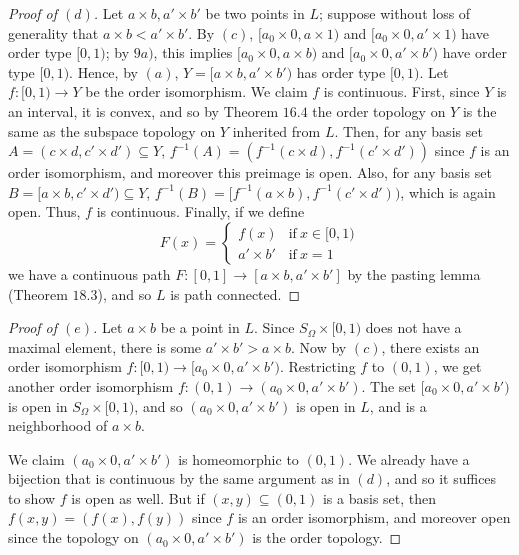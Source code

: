 \documentclass[12pt]{article}
\theoremstyle{remark}
\begin{document}
\begin{proof}[Proof of $(d)$]
  Let $a \times b, a' \times b'$ be two points in $L$; suppose without loss of
  generality that $a \times b < a' \times b'$. By $(c)$, $[a_0 \times 0,a \times
  1)$ and $[a_0 \times 0,a' \times 1)$ have order type $[0,1)$; by $9a)$, this
  implies $[a_0 \times 0,a \times b)$ and $[a_0 \times 0,a' \times b')$ have
  order type $[0,1)$. Hence, by $(a)$, $Y = [a \times b,a' \times b')$ has
  order type $[0,1)$. Let $f\colon [0,1) \to Y$ be the order isomorphism. We claim $f$ is continuous. First, since $Y$ is an interval, it is convex, and so by Theorem $16.4$ the order topology on $Y$ is the same as the subspace topology on $Y$ inherited from $L$. Then, for any basis set $A = (c \times d,c' \times d') \subseteq Y$, $f^{-1}(A) = (f^{-1}(c \times d),f^{-1}(c' \times d'))$ since $f$ is an order isomorphism, and moreover this preimage is open. Also, for any basis set $B = [a \times b,c'\times d') \subseteq Y$, $f^{-1}(B) = [f^{-1}(a \times b),f^{-1}(c' \times d'))$, which is again open. Thus, $f$ is continuous. Finally, if we define
  \begin{equation*}
    F(x) = \begin{cases}
      f(x) & \text{if}~x \in [0,1)\\
      a' \times b' & \text{if}~x=1
    \end{cases}
  \end{equation*}
  we have a continuous path $F\colon [0,1] \to [a \times b,a' \times b']$ by the pasting lemma (Theorem $18.3$), and so $L$ is path connected.
\end{proof}
\begin{proof}[Proof of $(e)$]
  Let $a \times b$ be a point in $L$. Since $S_\Omega \times [0,1)$ does not
  have a maximal element, there is some $a' \times b' > a \times b$. Now by
  $(c)$, there exists an order isomorphism $f\colon [0,1) \to [a_0 \times 0,a'
  \times b')$. Restricting $f$ to $(0,1)$, we get another order isomorphism
  $f\colon (0,1) \to (a_0 \times 0,a'\times b')$. The set $[a_0 \times 0,a' \times b')$ is open in $S_\Omega \times [0,1)$, and so $(a_0 \times 0,a' \times b')$ is open in $L$, and is a neighborhood of $a \times b$.
  \par We claim $(a_0 \times 0,a' \times b')$ is homeomorphic to $(0,1)$. We already have a bijection that is continuous by the same argument as in $(d)$, and so it suffices to show $f$ is open as well. But if $(x,y) \subseteq (0,1)$ is a basis set, then $f(x,y) = (f(x),f(y))$ since $f$ is an order isomorphism, and moreover open since the topology on $(a_0 \times 0,a' \times b')$ is the order topology.
\end{proof}
\end{document}
